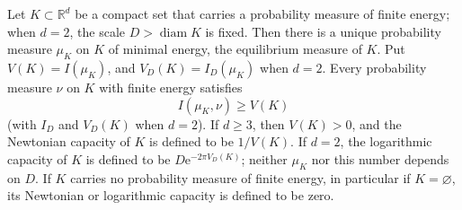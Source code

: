 \begin{theorem}\label{thm:equilibrium-measure}
Let $K\subset\mathbb R^d$ be a compact set that carries a probability measure of finite energy; when $d=2$, the scale $D>\operatorname{diam}K$ is fixed. Then there is a unique probability measure $\mu_K$ on $K$ of minimal energy, the equilibrium measure of $K$. Put $V(K)=I(\mu_K)$, and $V_D(K)=I_D(\mu_K)$ when $d=2$. Every probability measure $\nu$ on $K$ with finite energy satisfies
\[
 I(\mu_K,\nu)\geq V(K)
\]
(with $I_D$ and $V_D(K)$ when $d=2$). If $d\geq3$, then $V(K)>0$, and the Newtonian capacity of $K$ is defined to be $1/V(K)$. If $d=2$, the logarithmic capacity of $K$ is defined to be $D\mathrm e^{-2\pi V_D(K)}$; neither $\mu_K$ nor this number depends on $D$. If $K$ carries no probability measure of finite energy, in particular if $K=\varnothing$, its Newtonian or logarithmic capacity is defined to be zero.
\end{theorem}
